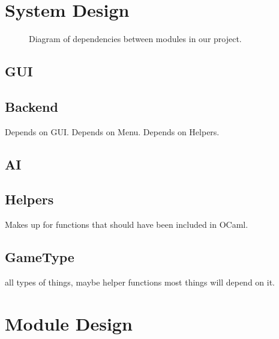 \documentclass[11pt, oneside]{article}
\begin{document}
\section{System Design}
\begin{figure}\label{fig:MDD}
  \centering
  \caption{Diagram of dependencies between modules in our project.}
\end{figure}
\subsection{GUI}
\subsection{Backend}
Depends on GUI.
Depends on Menu.
Depends on Helpers.
\subsection{AI}
\subsection{Helpers}
Makes up for functions that should have been included in OCaml.
\subsection{GameType}
all types of things, maybe helper functions
most things will depend on it.

\section{Module Design}
\end{document}
